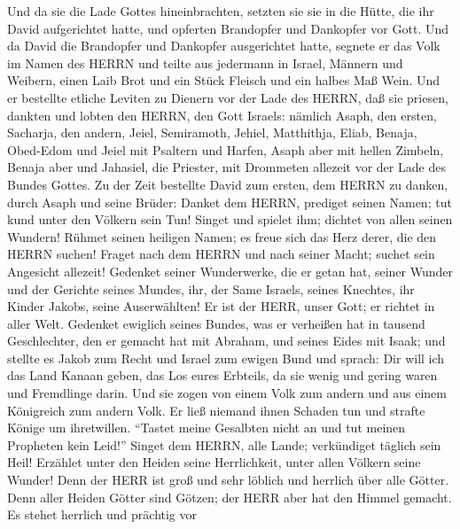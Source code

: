  Und da sie die Lade Gottes hineinbrachten, setzten sie sie
in die Hütte, die ihr David aufgerichtet hatte, und opferten Brandopfer
und Dankopfer vor Gott.  Und da David die Brandopfer und
Dankopfer ausgerichtet hatte, segnete er das Volk im Namen des HERRN
 und teilte aus jedermann in Israel, Männern und Weibern,
einen Laib Brot und ein Stück Fleisch und ein halbes Maß Wein.
 Und er bestellte etliche Leviten zu Dienern vor der Lade
des HERRN, daß sie priesen, dankten und lobten den HERRN, den Gott
Israels:  nämlich Asaph, den ersten, Sacharja, den andern,
Jeiel, Semiramoth, Jehiel, Matthithja, Eliab, Benaja, Obed-Edom und
Jeiel mit Psaltern und Harfen, Asaph aber mit hellen Zimbeln,
 Benaja aber und Jahasiel, die Priester, mit Drommeten
allezeit vor der Lade des Bundes Gottes.  Zu der Zeit
bestellte David zum ersten, dem HERRN zu danken, durch Asaph und seine
Brüder:  Danket dem HERRN, prediget seinen Namen; tut kund
unter den Völkern sein Tun!  Singet und spielet ihm; dichtet
von allen seinen Wundern!  Rühmet seinen heiligen Namen; es
freue sich das Herz derer, die den HERRN suchen!  Fraget
nach dem HERRN und nach seiner Macht; suchet sein Angesicht allezeit!
 Gedenket seiner Wunderwerke, die er getan hat, seiner
Wunder und der Gerichte seines Mundes,  ihr, der Same
Israels, seines Knechtes, ihr Kinder Jakobs, seine Auserwählten!
 Er ist der HERR, unser Gott; er richtet in aller Welt.
 Gedenket ewiglich seines Bundes, was er verheißen hat in
tausend Geschlechter,  den er gemacht hat mit Abraham, und
seines Eides mit Isaak;  und stellte es Jakob zum Recht und
Israel zum ewigen Bund  und sprach: Dir will ich das Land
Kanaan geben, das Los eures Erbteils,  da sie wenig und
gering waren und Fremdlinge darin.  Und sie zogen von einem
Volk zum andern und aus einem Königreich zum andern Volk. 
Er ließ niemand ihnen Schaden tun und strafte Könige um ihretwillen.
 ``Tastet meine Gesalbten nicht an und tut meinen Propheten
kein Leid!''  Singet dem HERRN, alle Lande; verkündiget
täglich sein Heil!  Erzählet unter den Heiden seine
Herrlichkeit, unter allen Völkern seine Wunder!  Denn der
HERR ist groß und sehr löblich und herrlich über alle Götter.
 Denn aller Heiden Götter sind Götzen; der HERR aber hat
den Himmel gemacht.  Es stehet herrlich und prächtig vor
